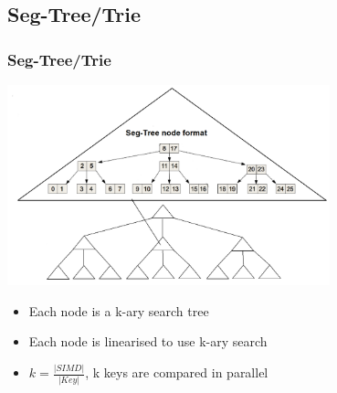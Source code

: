 \documentclass{beamer}
\begin{document}
\subsection{Seg-Tree/Trie}
\begin{frame}
\frametitle{Seg-Tree/Trie}
\begin{center}
	\includegraphics[width=0.7\textwidth]{img/seg_tree2.png}
\end{center}
\begin{itemize}
	\item Each node is a k-ary search tree
	\item Each node is linearised to use k-ary search
	\item $k = \frac{\vert SIMD \vert }{\vert Key \vert}$, k keys are compared in parallel
\end{itemize}
\end{frame}
\end{document}
